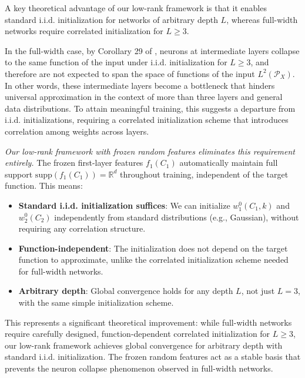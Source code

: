 \begin{remark}
\label{rem:iid-init-lowrank}
A key theoretical advantage of our low-rank framework is that it enables standard i.i.d. initialization for networks of arbitrary depth $L$, whereas full-width networks require correlated initialization for $L \geq 3$.

In the full-width case, by Corollary 29 of \cite{nguyen2023rigorousframeworkmeanfield}, neurons at intermediate layers collapse to the same function of the input under i.i.d. initialization for $L \geq 3$, and therefore are not expected to span the space of functions of the input $L^2(\mathcal{P}_X)$. In other words, these intermediate layers become a bottleneck that hinders universal approximation in the context of more than three layers and general data distributions. To attain meaningful training, this suggests a departure from i.i.d. initializations, requiring a correlated initialization scheme that introduces correlation among weights across layers.

\emph{Our low-rank framework with frozen random features eliminates this requirement entirely.} The frozen first-layer features $f_1(C_1)$ automatically maintain full support $\text{supp}(f_1(C_1)) = \mathbb{R}^d$ throughout training, independent of the target function. This means:
\begin{itemize}
\item \textbf{Standard i.i.d. initialization suffices}: We can initialize $w_1^0(C_1, k)$ and $w_2^0(C_2)$ independently from standard distributions (e.g., Gaussian), without requiring any correlation structure.
\item \textbf{Function-independent}: The initialization does not depend on the target function to approximate, unlike the correlated initialization scheme needed for full-width networks.
\item \textbf{Arbitrary depth}: Global convergence holds for any depth $L$, not just $L=3$, with the same simple initialization scheme.
\end{itemize}
This represents a significant theoretical improvement: while full-width networks require carefully designed, function-dependent correlated initialization for $L \geq 3$, our low-rank framework achieves global convergence for arbitrary depth with standard i.i.d. initialization. The frozen random features act as a stable basis that prevents the neuron collapse phenomenon observed in full-width networks.
\end{remark}

